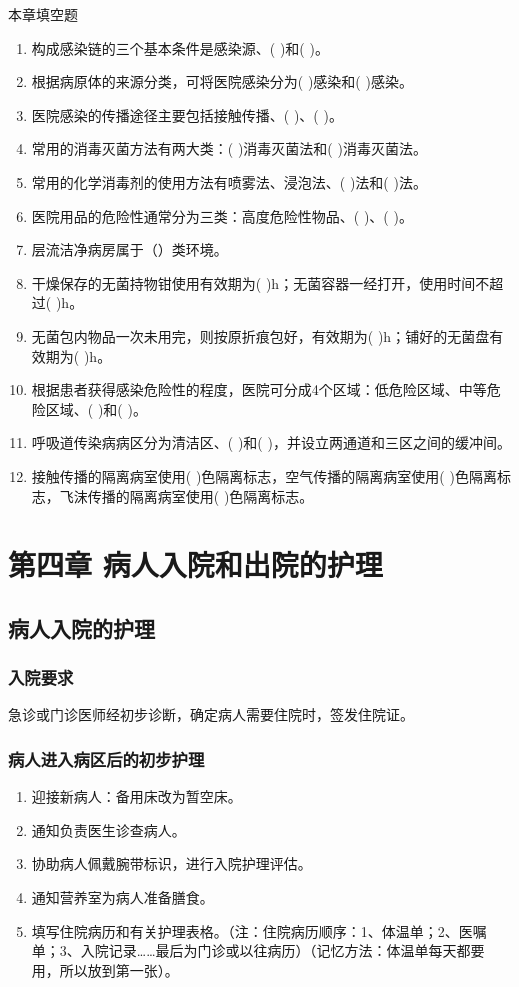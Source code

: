 \documentclass[11pt, a4paper]{ctexart}
\begin{document}
\begin{tipsbox}{本章填空题}
	\begin{enumerate}
		\item 构成感染链的三个基本条件是感染源、(     )和(      )。
		\item 根据病原体的来源分类，可将医院感染分为(    )感染和(    )感染。
		\item 医院感染的传播途径主要包括接触传播、(     )、(     )。
		\item 常用的消毒灭菌方法有两大类：(  )消毒灭菌法和(   )消毒灭菌法。
		\item 常用的化学消毒剂的使用方法有喷雾法、浸泡法、(   )法和(   )法。
		\item 医院用品的危险性通常分为三类：高度危险性物品、(      )、(       )。
		\item 层流洁净病房属于（\qquad）类环境。
		\item 干燥保存的无菌持物钳使用有效期为( )h；无菌容器一经打开，使用时间不超过(   )h。
		\item 无菌包内物品一次未用完，则按原折痕包好，有效期为(  )h；铺好的无菌盘有效期为(  )h。
		\item 根据患者获得感染危险性的程度，医院可分成4个区域：低危险区域、中等危险区域、(     )和(      )。
		\item 呼吸道传染病病区分为清洁区、(     )和(     )，并设立两通道和三区之间的缓冲间。
		\item 接触传播的隔离病室使用(   )色隔离标志，空气传播的隔离病室使用(  )色隔离标志，飞沫传播的隔离病室使用(  )色隔离标志。
	\end{enumerate}
\end{tipsbox}

\section{第四章 病人入院和出院的护理}
\subsection{病人入院的护理}
\subsubsection{入院要求}
急诊或门诊医师经初步诊断，确定病人需要住院时，签发住院证。

\subsubsection{病人进入病区后的初步护理}
\begin{enumerate}
	\item 迎接新病人：备用床改为暂空床。
	\item 通知负责医生诊查病人。
	\item 协助病人佩戴腕带标识，进行入院护理评估。
	\item 通知营养室为病人准备膳食。
	\item 填写住院病历和有关护理表格。（注：住院病历顺序：1、体温单；2、医嘱单；3、入院记录……最后为门诊或以往病历）（记忆方法：体温单每天都要用，所以放到第一张）。
\end{enumerate}
\end{document}
